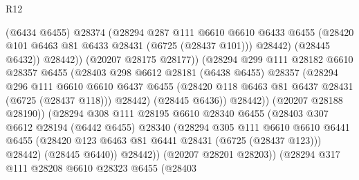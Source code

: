 \begin{lexlean}{R12}
\begin{coremodule}
                                (@6434 @6455)
                                @28374
                                (@28294
                                  @287
                                  @111
                                  @6610
                                  @6610
                                  @6433
                                  @6455
                                  (@28420 @101 @6463 @81 @6433 @28431 (@6725 (@28437 @101)))
                                  @28442)
                                (@28445 @6432))
                              @28442))
                          (@20207 @28175 @28177))
                        (@28294
                          @299
                          @111
                          @28182
                          @6610
                          @28357
                          @6455
                          (@28403
                            @298
                            @6612
                            @28181
                            (@6438 @6455)
                            @28357
                            (@28294
                              @296
                              @111
                              @6610
                              @6610
                              @6437
                              @6455
                              (@28420 @118 @6463 @81 @6437 @28431 (@6725 (@28437 @118)))
                              @28442)
                            (@28445 @6436))
                          @28442))
                      (@20207 @28188 @28190))
                    (@28294
                      @308
                      @111
                      @28195
                      @6610
                      @28340
                      @6455
                      (@28403
                        @307
                        @6612
                        @28194
                        (@6442 @6455)
                        @28340
                        (@28294
                          @305
                          @111
                          @6610
                          @6610
                          @6441
                          @6455
                          (@28420 @123 @6463 @81 @6441 @28431 (@6725 (@28437 @123)))
                          @28442)
                        (@28445 @6440))
                      @28442))
                  (@20207 @28201 @28203))
                (@28294
                  @317
                  @111
                  @28208
                  @6610
                  @28323
                  @6455
                  (@28403

\end{coremodule}
\end{lexlean}
